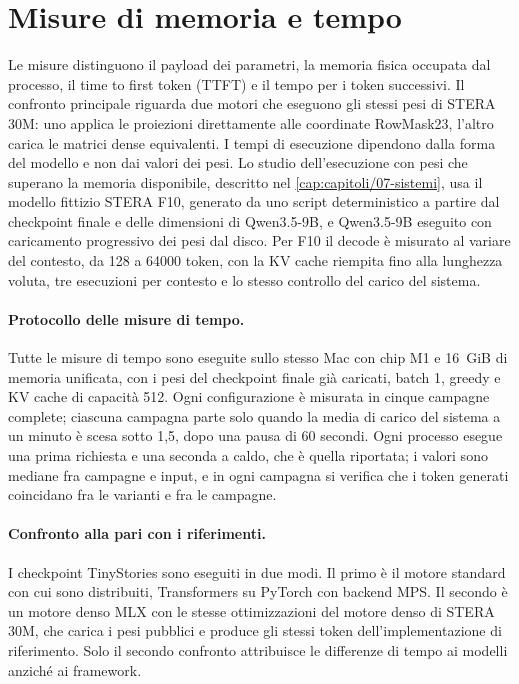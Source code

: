 \section{Misure di memoria e tempo}
\label{sec:metodo-sistemi}

Le misure distinguono il payload dei parametri, la memoria fisica occupata dal processo, il time to first token (TTFT) e il tempo per i token successivi. Il confronto principale riguarda due motori che eseguono gli stessi pesi di STERA 30M: uno applica le proiezioni direttamente alle coordinate RowMask23, l'altro carica le matrici dense equivalenti. I tempi di esecuzione dipendono dalla forma del modello e non dai valori dei pesi. Lo studio dell'esecuzione con pesi che superano la memoria disponibile, descritto nel \autoref{cap:capitoli/07-sistemi}, usa il modello fittizio STERA F10, generato da uno script deterministico a partire dal checkpoint finale e delle dimensioni di Qwen3.5-9B, e Qwen3.5-9B eseguito con caricamento progressivo dei pesi dal disco. Per F10 il decode è misurato al variare del contesto, da 128 a \num{64000} token, con la KV cache riempita fino alla lunghezza voluta, tre esecuzioni per contesto e lo stesso controllo del carico del sistema.

\paragraph{Protocollo delle misure di tempo.} Tutte le misure di tempo sono eseguite sullo stesso Mac con chip M1 e 16~GiB di memoria unificata, con i pesi del checkpoint finale già caricati, batch 1, greedy e KV cache di capacità 512. Ogni configurazione è misurata in cinque campagne complete; ciascuna campagna parte solo quando la media di carico del sistema a un minuto è scesa sotto 1,5, dopo una pausa di 60 secondi. Ogni processo esegue una prima richiesta e una seconda a caldo, che è quella riportata; i valori sono mediane fra campagne e input, e in ogni campagna si verifica che i token generati coincidano fra le varianti e fra le campagne.

\paragraph{Confronto alla pari con i riferimenti.} I checkpoint TinyStories sono eseguiti in due modi. Il primo è il motore standard con cui sono distribuiti, Transformers su PyTorch con backend MPS. Il secondo è un motore denso MLX con le stesse ottimizzazioni del motore denso di STERA 30M, che carica i pesi pubblici e produce gli stessi token dell'implementazione di riferimento. Solo il secondo confronto attribuisce le differenze di tempo ai modelli anziché ai framework.

